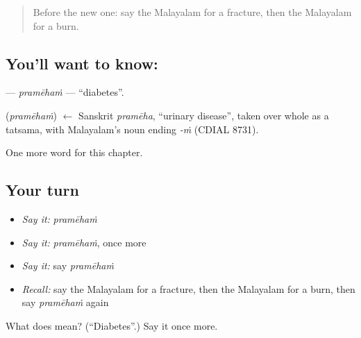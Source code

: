 \label{lesson:ML-C274-prameham}



\begin{quote}
Before the new one: say the Malayalam for a fracture, then the Malayalam for a burn.
\end{quote}

\subsection*{You'll want to know: }
\textbf{} — \emph{pramēhaṁ} — \textquotedblleft{}diabetes\textquotedblright{}.

\begin{cousinweb}
\textbf{} (\emph{pramēhaṁ}) $\leftarrow$ Sanskrit \emph{pramēha}, \textquotedblleft{}urinary disease\textquotedblright{}, taken over whole as a tatsama, with Malayalam's noun ending \emph{-ṁ} (CDIAL 8731).
\end{cousinweb}

\begin{grammarlens}[title={What you've built}]
One more word for this chapter.
\end{grammarlens}

\subsection*{Your turn}
\begin{itemize}
\raggedright
  \item \emph{Say it:} \emph{pramēhaṁ}
  \item \emph{Say it:} \emph{pramēhaṁ}, once more
  \item \emph{Say it:} say \emph{pramēhaṁ}
  \item \emph{Recall:} say the Malayalam for a fracture, then the Malayalam for a burn, then say \emph{pramēhaṁ} again
\end{itemize}

\begin{tcolorbox}[breakable,colback=teal!4,colframe=teal!35!black,title={Before you move on}]
What does  mean? (\textquotedblleft{}Diabetes\textquotedblright{}.) Say it once more.
\end{tcolorbox}
